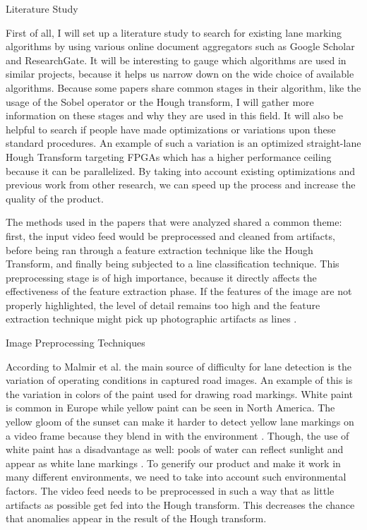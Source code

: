 \documentclass{matthijs}
\begin{document}
	\begin{hoofdstuk}{Literature Study}

		First of all, I will set up a literature study to search for existing lane marking algorithms by using various online document aggregators such as Google Scholar and ResearchGate.
		It will be interesting to gauge which algorithms are used in similar projects, because it helps us narrow down on the wide choice of available algorithms.
		Because some papers share common stages in their algorithm, like the usage of the Sobel operator or the Hough transform, I will gather more information on these stages and why they are used in this field.
		It will also be helpful to search if people have made optimizations or variations upon these standard procedures.
		An example of such a variation is an optimized straight-lane Hough Transform targeting FPGAs \cite{el2020novel} which has a higher performance ceiling because it can be parallelized.
		By taking into account existing optimizations and previous work from other research, we can speed up the process and increase the quality of the product.

		\bigskip

		The methods used in the papers that were analyzed shared a common theme: first, the input video feed would be preprocessed and cleaned from artifacts, before being ran through a feature extraction technique like the Hough Transform, and finally being subjected to a line classification technique.
		This preprocessing stage is of high importance, because it directly affects the effectiveness of the feature extraction phase.
		If the features of the image are not properly highlighted, the level of detail remains too high and the feature extraction technique might pick up photographic artifacts as lines \cite{felix2003low}.

		\begin{paragraaf}{Image Preprocessing Techniques}

			According to Malmir et al. \cite{malmir2019design} the main source of difficulty for lane detection is the variation of operating conditions in captured road images.
			An example of this is the variation in colors of the paint used for drawing road markings.
			White paint is common in Europe while yellow paint can be seen in North America.
			The yellow gloom of the sunset can make it harder to detect yellow lane markings on a video frame because they blend in with the environment \cite{tumasov2021research}.
			Though, the use of white paint has a disadvantage as well: pools of water can reflect sunlight and appear as white lane markings \cite{krine2021road}.
			To generify our product and make it work in many different environments, we need to take into account such environmental factors.
			The video feed needs to be preprocessed in such a way that as little artifacts as possible get fed into the Hough transform.
			This decreases the chance that anomalies appear in the result of the Hough transform.
			

\end{paragraaf}
\end{hoofdstuk}
\end{document}
